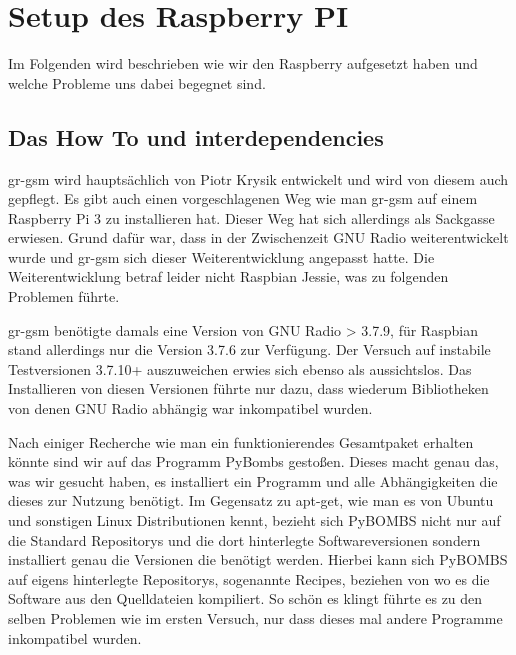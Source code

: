 %
%
\chapter{Setup des Raspberry PI}
Im Folgenden wird beschrieben wie wir den Raspberry aufgesetzt haben und welche Probleme uns dabei begegnet sind.
\section{Das How To und interdependencies}

gr-gsm wird hauptsächlich von Piotr Krysik entwickelt und wird von diesem auch gepflegt. Es gibt auch einen vorgeschlagenen Weg wie man gr-gsm auf einem Raspberry Pi 3 zu installieren hat. Dieser Weg hat sich allerdings als Sackgasse erwiesen. Grund dafür war, dass in der Zwischenzeit GNU Radio weiterentwickelt wurde und gr-gsm sich dieser Weiterentwicklung angepasst hatte. Die Weiterentwicklung betraf leider nicht Raspbian Jessie, was zu folgenden Problemen führte.

gr-gsm benötigte damals eine Version von GNU Radio > 3.7.9, für Raspbian stand allerdings nur die Version 3.7.6 zur Verfügung. Der Versuch auf instabile Testversionen 3.7.10+ auszuweichen erwies sich ebenso als aussichtslos. Das Installieren von diesen Versionen führte nur dazu, dass wiederum Bibliotheken von denen GNU Radio abhängig war inkompatibel wurden.

Nach einiger Recherche wie man ein funktionierendes Gesamtpaket erhalten könnte sind wir auf das Programm PyBombs gestoßen. Dieses macht genau das, was wir gesucht haben, es installiert ein Programm und alle Abhängigkeiten die dieses zur Nutzung benötigt. Im Gegensatz zu apt-get, wie man es von Ubuntu und sonstigen Linux Distributionen kennt, bezieht sich PyBOMBS nicht nur auf die Standard Repositorys und die dort hinterlegte Softwareversionen sondern installiert genau die Versionen die benötigt werden. Hierbei kann sich PyBOMBS auf eigens hinterlegte Repositorys, sogenannte Recipes, beziehen von wo es die Software aus den Quelldateien kompiliert. 
So schön es klingt führte es zu den selben Problemen wie im ersten Versuch, nur dass dieses mal andere Programme inkompatibel wurden.


